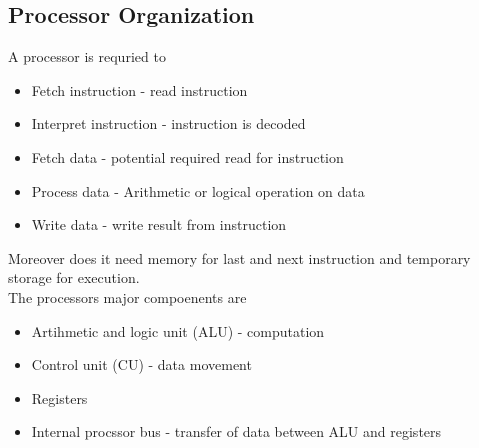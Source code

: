 \documentclass[12pt, a4paper]{article}
\begin{document}
		\subsection{Processor Organization}
			A processor is requried to
			\begin{itemize}
				\item Fetch instruction - read instruction
				\item Interpret instruction - instruction is decoded
				\item Fetch data - potential required read for instruction
				\item Process data - Arithmetic or logical operation on data
				\item Write data - write result from instruction
			\end{itemize}
			Moreover does it need memory for last and next instruction and temporary storage for execution.\\
			The processors major compoenents are
			\begin{itemize}
				\item Artihmetic and logic unit (ALU) - computation
				\item Control unit (CU) - data movement
				\item Registers
				\item Internal procssor bus - transfer of data between ALU and registers
			\end{itemize}
\end{document}

